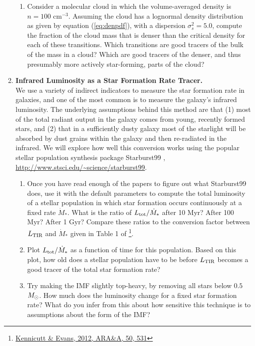 \begin{enumerate}
\begin{enumerate}
\item Consider a molecular cloud in which the volume-averaged density is $n=100$ cm$^{-3}$. Assuming the cloud has a lognormal density distribution as given by equation (\ref{eq:denpdf}), with a dispersion $\sigma_s^2 = 5.0$, compute the fraction of the cloud mass that is denser than the critical density for each of these transitions. Which transitions are good tracers of the bulk of the mass in a cloud? Which are good tracers of the denser, and thus presumably more actively star-forming, parts of the cloud?
\end{enumerate} 

\vspace{0.2in}

\item \textbf{Infrared Luminosity as a Star Formation Rate Tracer.}\\
We use a variety of indirect indicators to measure the star formation rate in galaxies, and one of the most common is to measure the galaxy's infrared luminosity. The underlying assumptions behind this method are that (1) most of the total radiant output in the galaxy comes from young, recently formed stars, and (2) that in a sufficiently dusty galaxy most of the starlight will be absorbed by dust grains within the galaxy and then re-radiated in the infrared. We will explore how well this conversion works using the popular stellar population synthesis package Starburst99 \citep{leitherer99a, vazquez05a}, \url{http://www.stsci.edu/~science/starburst99}.
\begin{enumerate}
\item Once you have read enough of the papers to figure out what Starburst99 does, use it with the default parameters to compute the total luminosity of a stellar population in which star formation occurs continuously at a fixed rate $\dot{M}_*$. What is the ratio of $L_{\rm tot}/\dot{M}_*$ after 10 Myr? After 100 Myr? After 1 Gyr? Compare these ratios to the conversion factor between $L_{\rm TIR}$ and $\dot{M}_*$ given in Table 1 of \citet{kennicutt12a}\footnote{\href{http://adsabs.harvard.edu/abs/2012ARA\%26A..50..531K}{Kennicutt \& Evans, 2012, ARA\&A, 50, 531}}.
\item Plot $L_{\rm tot}/\dot{M}_*$ as a function of time for this population. Based on this plot, how old does a stellar population have to be before $L_{\rm TIR}$ becomes a good tracer of the total star formation rate?
\item Try making the IMF slightly top-heavy, by removing all stars below $0.5$ $M_{\odot}$. How much does the luminosity change for a fixed star formation rate? What do you infer from this about how sensitive this technique is to assumptions about the form of the IMF?
\end{enumerate}

\end{enumerate}
